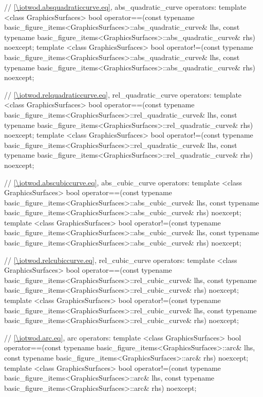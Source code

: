 \begin{codeblock}
{  // \ref{\iotwod.absquadraticcurve.eq}, abs_quadratic_curve operators:
  template <class GraphicsSurfaces>
  bool operator==(const typename
    basic_figure_items<GraphicsSurfaces>::abs_quadratic_curve& lhs,
    const typename basic_figure_items<GraphicsSurfaces>::abs_quadratic_curve& 
    rhs) noexcept;
  template <class GraphicsSurfaces>
  bool operator!=(const typename 
    basic_figure_items<GraphicsSurfaces>::abs_quadratic_curve& lhs,
    const typename basic_figure_items<GraphicsSurfaces>::abs_quadratic_curve& 
    rhs) noexcept;

  // \ref{\iotwod.relquadraticcurve.eq}, rel_quadratic_curve operators:
  template <class GraphicsSurfaces>
  bool operator==(const typename 
    basic_figure_items<GraphicsSurfaces>::rel_quadratic_curve& lhs,
    const typename basic_figure_items<GraphicsSurfaces>::rel_quadratic_curve& 
    rhs) noexcept;
  template <class GraphicsSurfaces>
  bool operator!=(const typename 
    basic_figure_items<GraphicsSurfaces>::rel_quadratic_curve& lhs,
    const typename basic_figure_items<GraphicsSurfaces>::rel_quadratic_curve& 
    rhs) noexcept;

  // \ref{\iotwod.abscubiccurve.eq}, abs_cubic_curve operators:
  template <class GraphicsSurfaces>
  bool operator==(const typename 
    basic_figure_items<GraphicsSurfaces>::abs_cubic_curve& lhs,
    const typename basic_figure_items<GraphicsSurfaces>::abs_cubic_curve& rhs) 
    noexcept;
  template <class GraphicsSurfaces>
  bool operator!=(const typename 
    basic_figure_items<GraphicsSurfaces>::abs_cubic_curve& lhs,
    const typename basic_figure_items<GraphicsSurfaces>::abs_cubic_curve& rhs) 
    noexcept;

  // \ref{\iotwod.relcubiccurve.eq}, rel_cubic_curve operators:
  template <class GraphicsSurfaces>
  bool operator==(const typename 
    basic_figure_items<GraphicsSurfaces>::rel_cubic_curve& lhs,
    const typename basic_figure_items<GraphicsSurfaces>::rel_cubic_curve& rhs) 
    noexcept;
  template <class GraphicsSurfaces>
  bool operator!=(const typename 
    basic_figure_items<GraphicsSurfaces>::rel_cubic_curve& lhs,
    const typename basic_figure_items<GraphicsSurfaces>::rel_cubic_curve& rhs) 
    noexcept;

  // \ref{\iotwod.arc.eq}, arc operators:
  template <class GraphicsSurfaces>
  bool operator==(const typename basic_figure_items<GraphicsSurfaces>::arc& lhs,
    const typename basic_figure_items<GraphicsSurfaces>::arc& rhs) noexcept;
  template <class GraphicsSurfaces>
  bool operator!=(const typename basic_figure_items<GraphicsSurfaces>::arc& lhs,
    const typename basic_figure_items<GraphicsSurfaces>::arc& rhs) noexcept;
}
\end{codeblock}